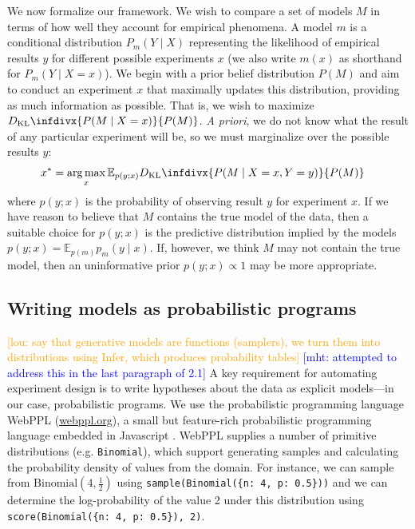 \documentclass{article}
\newcommand{\dkl}{D_\mathrm{KL}\infdivx}
\newcommand{\mht}[1]{\textcolor{Blue}{[mht: #1]}}
\newcommand{\lou}[1]{\textcolor{orange}{[lou: #1]}}
\DeclareMathOperator*{\argmax}{arg\,max}
\begin{document}
We now formalize our framework.
We wish to compare a set of models $M$ in terms of how well they account for empirical phenomena.
A model $m$ is a conditional distribution $P_m(Y \mid X)$ representing the likelihood of empirical results $y$ for different possible experiments $x$ (we also write $m(x)$ as shorthand for $P_m(Y \mid X = x)$).
We begin with a prior belief distribution $P(M)$ and aim to conduct an experiment $x$ that maximally updates this distribution, providing as much information as possible.
That is, we wish to maximize $\dkl{ P(M \mid X = x) }{ P(M) }$.
\emph{A priori}, we do not know what the result of any particular experiment will be, so we must marginalize over the possible results $y$:
\begin{align}
  x^{*} &= \argmax_{x} {\mathbb E}_{p(y ; x)} \dkl{ P(M \mid X = x, Y = y) }{ P(M) }  \label{eq:oed}
\end{align}
where $p(y ; x)$ is the probability of observing result $y$ for experiment $x$.
If we have reason to believe that $M$ contains the true model of the data, then a suitable choice for $p(y ; x)$ is the predictive distribution implied by the models $p(y ; x) = {\mathbb E}_{p(m)} p_m(y \mid x)$.
If, however, we think $M$ may not contain the true model, then an uninformative prior $p(y ; x) \propto 1$ may be more appropriate.

\subsection{Writing models as probabilistic programs}

\lou{say that generative models are functions (samplers), we turn them into distributions using Infer, which produces probability tables}
\mht{attempted to address this in the last paragraph of 2.1}
A key requirement for automating experiment design is to write hypotheses about the data as explicit models---in our case, probabilistic programs.
We use the probabilistic programming language WebPPL (\url{webppl.org}), a small but feature-rich probabilistic programming language embedded in Javascript \cite{dippl}.
WebPPL supplies a number of primitive distributions (e.g. \lstinline{Binomial}), which support generating samples and calculating the probability density of values from the domain.
For instance, we can sample from $\text{Binomial}(4, \frac{1}{2})$ using \lstinline|sample(Binomial({n: 4, p: 0.5}))| and we can determine the log-probability of the value 2 under this distribution using \lstinline|score(Binomial({n: 4, p: 0.5}), 2)|.
\end{document}
